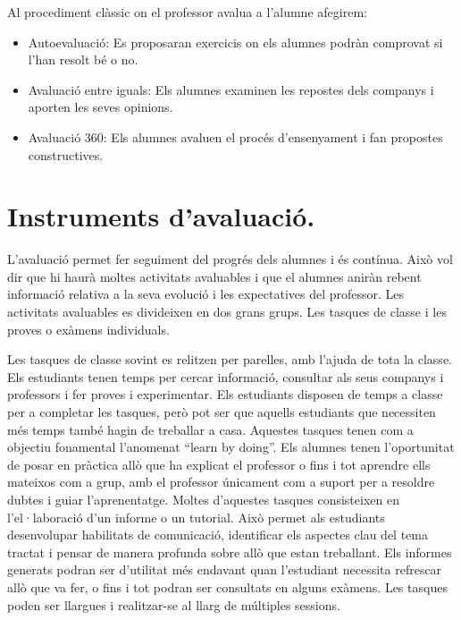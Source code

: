 \documentclass[catalan, a4paper, 12pt, titlepage]{article}
\begin{document}
Al procediment clàssic on el professor avalua a l'alumne afegirem:

\begin{itemize}
	\item Autoevaluació: Es proposaran exercicis on els alumnes podràn comprovat si l'han resolt bé o no.
	\item Avaluació entre iguals: Els alumnes examinen les repostes dels companys i aporten les seves opinions.
	\item Avaluació 360: Els alumnes avaluen el procés d'ensenyament i fan propostes constructives.
\end{itemize}

\section{Instruments d'avaluació.}
\label{sec:instruments}

L'avaluació permet fer seguiment del progrés dels alumnes i és contínua.
Això vol dir que hi haurà moltes activitats avaluables i que el alumnes aniràn rebent informació relativa a la seva evolució i les expectatives del professor.
Les activitats avaluables es divideixen en dos grans grups. 
Les tasques de classe i les proves o exàmens individuals.

Les tasques de classe sovint es relitzen per parelles, amb l'ajuda de tota la classe.
Els estudiants tenen temps per cercar informació, consultar als seus companys i professors i fer proves i experimentar. 
Els estudiants disposen de temps a classe per a completar les tasques, però pot ser que aquells estudiants que necessiten més temps també hagin de treballar a casa.
Aquestes tasques tenen com a objectiu fonamental l'anomenat ``learn by doing''.
Els alumnes tenen l'oportunitat de posar en pràctica allò que ha explicat el professor o fins i tot aprendre ells mateixos com a grup, amb el professor únicament com a suport per a resoldre dubtes i guiar l'aprenentatge.
Moltes d'aquestes tasques consisteixen en l'el·laboració d'un informe o un tutorial.
Això permet als estudiants desenvolupar habilitats de comunicació, identificar els aspectes clau del tema tractat i pensar de manera profunda sobre allò que estan treballant. Els informes generats podran ser d'utilitat més endavant quan l'estudiant necessita refrescar allò que va fer, o fins i tot podran ser consultats en alguns exàmens.
Les tasques poden ser llargues i realitzar-se al llarg de múltiples sessions.
\end{document}
